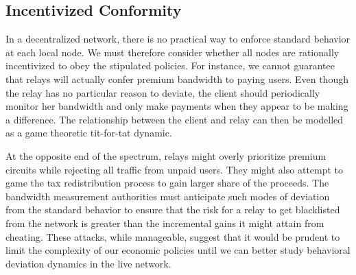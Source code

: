 \subsection{Incentivized Conformity} In a decentralized network, there is no
practical way to enforce standard behavior at each local node. We must therefore
consider whether all nodes are rationally incentivized to obey the stipulated
policies. For instance, we cannot guarantee that relays will actually confer
premium bandwidth to paying users. Even though the relay has no particular
reason to deviate, the client should periodically monitor her bandwidth and only
make payments when they appear to be making a difference. The relationship
between the client and relay can then be modelled as a game theoretic tit-for-tat
dynamic.

At the opposite end of the spectrum, relays might overly prioritize premium
circuits while rejecting all traffic from unpaid users. They might also attempt
to game the tax redistribution process to gain larger share of the proceeds. The
bandwidth measurement authorities must anticipate such modes of deviation from
the standard behavior to ensure that the risk for a relay to get blacklisted
from the network is greater than the incremental gains it might attain from
cheating. These attacks, while manageable, suggest that it would be prudent to
limit the complexity of our economic policies until we can better study
behavioral deviation dynamics in the live network.

